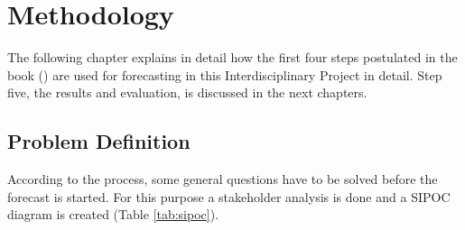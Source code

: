 \chapter{Methodology}\label{chapter:Methodology}
The following chapter explains in detail how the first four steps postulated in the book (\cite{Hyndman.2013}) are used for forecasting in this Interdisciplinary Project in detail. Step five, the results and evaluation, is discussed in the next chapters.\newline
\section{Problem Definition}\label{section:Problem Definition}
According to the process, some general questions have to be solved before the forecast is started. For this purpose a stakeholder analysis is done and a SIPOC diagram is created (Table \ref{tab:sipoc}).

